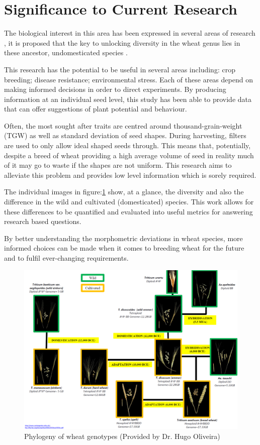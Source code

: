 \documentclass[11pt]{report}
\begin{document}
\section{Significance to Current Research}
\label{sec:org6882cf3}
The biological interest in this area has been expressed in several areas of research \cite{Leigh2013}, it is proposed that the key to unlocking diversity in the wheat genus lies in these ancestor, undomesticated species \cite{Cockram2007}.

This research has the potential to be useful in several areas including: crop breeding; disease resistance; environmental stress. Each of these areas depend on making informed decisions in order to direct experiments. By producing information at an individual seed level, this study has been able to provide data that can offer suggestions of plant potential and behaviour.

Often, the most sought after traits are centred around thousand-grain-weight (TGW) as well as standard deviation of seed shapes. During harvesting, filters are used to only allow ideal shaped seeds through. This means that, potentially, despite a breed of wheat providing a high average volume of seed in reality much of it may go to waste if the shapes are not uniform. This research aims to alleviate this problem and provides low level information which is sorely required.

The individual images in figure:\ref{fig:org76b1c2a} show, at a glance, the diversity and also the difference in the wild and cultivated (domesticated)
species. This work allows for these differences to be quantified and evaluated into useful metrics for answering research based questions.

By better understanding the morphometric deviations in wheat species, more informed choices can be made when it comes to breeding wheat for the future and to fulfil ever-changing requirements.

\clearpage

\begin{figure}[htbp]
\centering
\includegraphics[width=17cm]{./images/philotree.png}
\caption{\label{fig:org76b1c2a}
Phylogeny of wheat genotypes (Provided by Dr. Hugo Oliveira)}
\end{figure}
\end{document}
